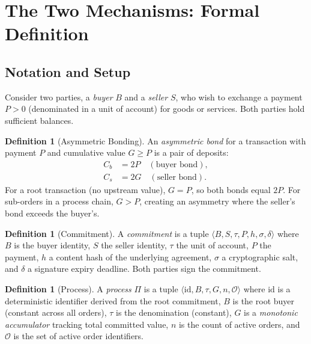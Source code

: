 \documentclass[11pt,a4paper]{article}
\theoremstyle{definition}
\newtheorem{definition}[theorem]{Definition}
\theoremstyle{remark}
\newcommand{\pay}{P}           %
\newcommand{\cumval}{G}        %
\newcommand{\sbond}{C_s}       %
\newcommand{\bbond}{C_b}       %
\begin{document}
\section{The Two Mechanisms: Formal Definition}
\label{sec:mechanism}

\subsection{Notation and Setup}

Consider two parties, a \emph{buyer} $B$ and a \emph{seller} $S$, who
wish to exchange a payment $\pay > 0$ (denominated in a unit of
account) for goods or services. Both parties hold sufficient balances.

\begin{definition}[Asymmetric Bonding]
\label{def:asymmetric-bonding}
An \emph{asymmetric bond} for a transaction with payment $\pay$ and
cumulative value $\cumval \geq \pay$ is a pair of deposits:
\begin{align}
  \bbond &= 2\pay \quad (\text{buyer bond}), \label{eq:buyer-bond} \\
  \sbond &= 2\cumval \quad (\text{seller bond}). \label{eq:seller-bond}
\end{align}
For a root transaction (no upstream value), $\cumval = \pay$, so both
bonds equal $2\pay$. For sub-orders in a process chain,
$\cumval > \pay$, creating an asymmetry where the seller's bond exceeds
the buyer's.
\end{definition}

\begin{definition}[Commitment]
\label{def:commitment}
A \emph{commitment} is a tuple $\langle B, S, \tau, \pay, h, \sigma,
\delta \rangle$ where $B$ is the buyer identity, $S$ the seller
identity, $\tau$ the unit of account, $\pay$ the payment, $h$ a
content hash of the underlying agreement, $\sigma$ a cryptographic
salt, and $\delta$ a signature expiry deadline. Both parties sign
the commitment.
\end{definition}

\begin{definition}[Process]
\label{def:process}
A \emph{process} $\Pi$ is a tuple $\langle \text{id}, B, \tau,
\cumval, n, \mathcal{O} \rangle$ where $\text{id}$ is a deterministic
identifier derived from the root commitment, $B$ is the root buyer
(constant across all orders), $\tau$ is the denomination (constant),
$\cumval$ is a \emph{monotonic accumulator} tracking total committed
value, $n$ is the count of active orders, and $\mathcal{O}$ is the
set of active order identifiers.
\end{definition}
\end{document}
